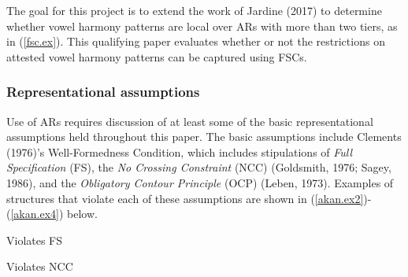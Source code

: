 \documentclass[floatsintext,man]{apa6}
\theoremstyle{definition}
\theoremstyle{definition}
\theoremstyle{definition}
\theoremstyle{remark}
\begin{document}
The goal for this project is to extend the work of Jardine (2017) to
determine whether vowel harmony patterns are local over ARs with more
than two tiers, as in (\ref{fsc.ex}). This qualifying paper evaluates
whether or not the restrictions on attested vowel harmony patterns can
be captured using FSCs.

\subsubsection{Representational
assumptions}\label{representational-assumptions}

Use of ARs requires discussion of at least some of the basic
representational assumptions held throughout this paper. The basic
assumptions include Clements (1976)'s Well-Formedness Condition, which
includes stipulations of \emph{Full Specification} (FS), the \emph{No
Crossing Constraint} (NCC) (Goldsmith, 1976; Sagey, 1986), and the
\emph{Obligatory Contour Principle} (OCP) (Leben, 1973). Examples of
structures that violate each of these assumptions are shown in
(\ref{akan.ex2})-(\ref{akan.ex4}) below.

\begin{exe}
\ex \label{akan.ex2} Violates FS
\end{exe}

\begin{exe}
\ex \label{akan.ex3} Violates NCC
\end{exe}
\end{document}
